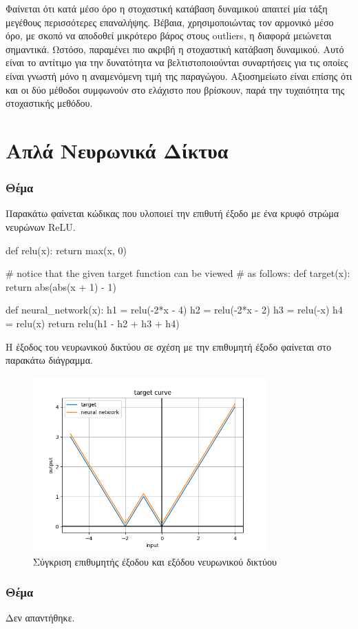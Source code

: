 \documentclass{article}
\newcommand{\eng}[1]{\foreignlanguage{english}{#1}} %
\begin{document}
Φαίνεται ότι κατά μέσο όρο η στοχαστική κατάβαση δυναμικού απαιτεί μία τάξη μεγέθους
περισσότερες επαναλήψης. Βέβαια, χρησιμοποιώντας τον αρμονικό μέσο όρο, με σκοπό
να αποδοθεί μικρότερο βάρος στους \eng{outliers}, η διαφορά μειώνεται σημαντικά.
Ωστόσο, παραμένει πιο ακριβή η στοχαστική κατάβαση δυναμικού. Αυτό είναι το αντίτιμο
για την δυνατότητα να βελτιστοποιούνται συναρτήσεις για τις οποίες είναι γνωστή μόνο
η αναμενόμενη τιμή της παραγώγου. Αξιοσημείωτο είναι επίσης ότι και οι δύο μέθοδοι
συμφωνούν στο ελάχιστο που βρίσκουν, παρά την τυχαιότητα της στοχαστικής μεθόδου.

\clearpage
\part{Απλά Νευρωνικά Δίκτυα}
\section{Θέμα}

Παρακάτω φαίνεται κώδικας που υλοποιεί την επιθυτή έξοδο με ένα κρυφό στρώμα
νευρώνων \eng{ReLU}.

\begin{python}
def relu(x):
    return max(x, 0)

# notice that the given target function can be viewed
# as follows:
def target(x):
    return abs(abs(x + 1) - 1)

def neural_network(x):
    h1 = relu(-2*x - 4)
    h2 = relu(-2*x - 2)
    h3 = relu(-x)
    h4 = relu(x)
    return relu(h1 - h2 + h3 + h4)
\end{python}

Η έξοδος του νευρωνικού δικτύου σε σχέση με την επιθυμητή έξοδο φαίνεται στο
παρακάτω διάγραμμα.

\begin{figure}[h]
    \centering
    \includegraphics[width=0.8\textwidth]{part2/target-curve.png}
    \caption{Σύγκριση επιθυμητής έξοδου και εξόδου νευρωνικού δικτύου}
\end{figure}
\clearpage
\section{Θέμα}

Δεν απαντήθηκε.
\end{document}

